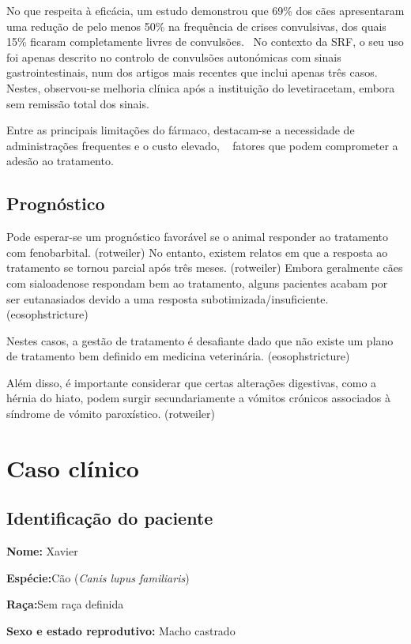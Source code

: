 No que respeita à eficácia, um estudo demonstrou que 69\% dos cães apresentaram uma redução de pelo menos 50\% na frequência de crises convulsivas, dos quais 15\% ficaram completamente livres de convulsões.~\cite{Packer2015} No contexto da SRF, o seu uso foi apenas descrito no controlo de convulsões autonómicas com sinais gastrointestinais, num dos artigos mais recentes que inclui apenas três casos. Nestes, observou-se melhoria clínica após a instituição do levetiracetam, embora sem remissão total dos sinais.~\cite{Diop2025}


Entre as principais limitações do fármaco, destacam-se a necessidade de administrações frequentes e o custo elevado, ~\cite{ajvr} fatores que podem comprometer a adesão ao tratamento.

\subsection{Prognóstico}


Pode esperar-se um prognóstico favorável se o animal responder ao tratamento com fenobarbital. (rotweiler) No entanto, existem relatos em que a resposta ao tratamento se tornou parcial após três meses. (rotweiler) Embora geralmente cães com sialoadenose respondam bem ao tratamento, alguns pacientes acabam por ser eutanasiados devido a uma resposta subotimizada/insuficiente. (eosophstricture) 

Nestes casos, a gestão de tratamento é desafiante dado que não existe um plano de tratamento bem definido em medicina veterinária. (eosophstricture)


Além disso, é importante considerar que certas alterações digestivas, como a hérnia do hiato, podem surgir secundariamente a vómitos crónicos associados à síndrome de vómito paroxístico. (rotweiler)


\section{Caso clínico}


\subsection{Identificação do paciente}


\textbf{Nome:} Xavier


\textbf{Espécie:}Cão (\textit{Canis lupus familiaris})


\textbf{Raça:}Sem raça definida


\textbf{Sexo e estado reprodutivo:} Macho castrado


